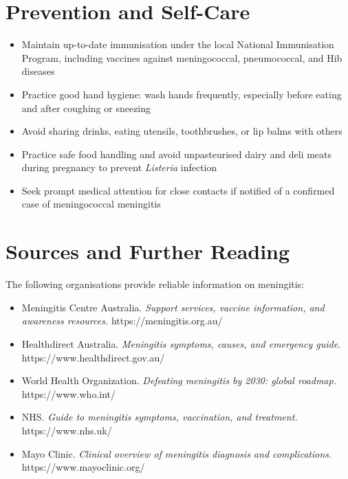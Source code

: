 \section*{Prevention and Self-Care}
\begin{itemize}
    \item Maintain up-to-date immunisation under the local National Immunisation Program, including vaccines against meningococcal, pneumococcal, and Hib diseases
    \item Practice good hand hygiene: wash hands frequently, especially before eating and after coughing or sneezing
    \item Avoid sharing drinks, eating utensils, toothbrushes, or lip balms with others
    \item Practice safe food handling and avoid unpasteurised dairy and deli meats during pregnancy to prevent \textit{Listeria} infection
    \item Seek prompt medical attention for close contacts if notified of a confirmed case of meningococcal meningitis
\end{itemize}

\section*{Sources and Further Reading}
The following organisations provide reliable information on meningitis:

\begin{itemize}
    \item Meningitis Centre Australia. \textit{Support services, vaccine information, and awareness resources.} https://meningitis.org.au/
    \item Healthdirect Australia. \textit{Meningitis symptoms, causes, and emergency guide.} https://www.healthdirect.gov.au/
    \item World Health Organization. \textit{Defeating meningitis by 2030: global roadmap.} https://www.who.int/
    \item NHS. \textit{Guide to meningitis symptoms, vaccination, and treatment.} https://www.nhs.uk/
    \item Mayo Clinic. \textit{Clinical overview of meningitis diagnosis and complications.} https://www.mayoclinic.org/
\end{itemize}
